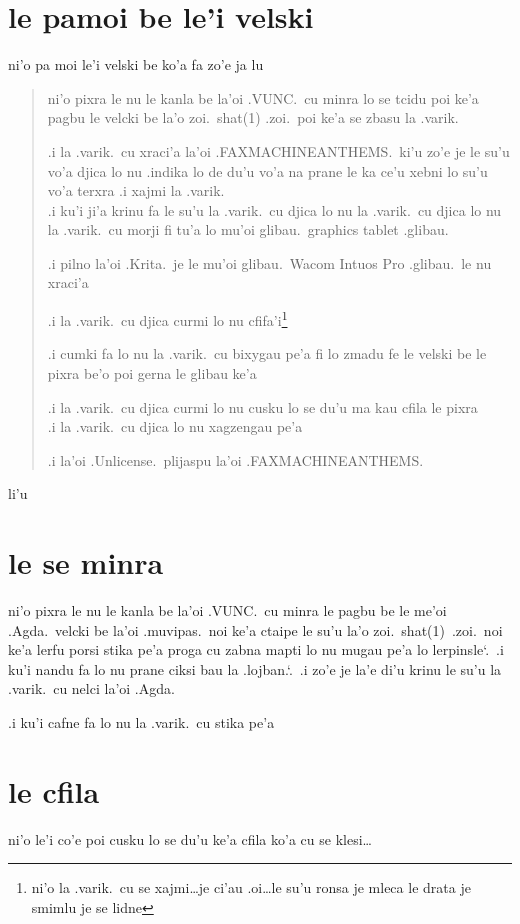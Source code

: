 \documentclass{report}
\newcommand\sds{\spacefactor\sfcode`.\ \space}
\begin{document}
\section{le pamoi be le'i velski}
ni'o pa moi le'i velski be ko'a fa zo'e ja lu

\begin{quote}
	ni'o pixra le nu le kanla be la'oi .VUNC.\ cu minra lo se tcidu poi ke'a pagbu le velcki be la'o zoi.\ shat(1) .zoi.\ poi ke'a se zbasu la .varik.

	.i la .varik.\ cu xraci'a la'oi .FAXMACHINEANTHEMS.\ ki'u zo'e je le su'u vo'a djica lo nu .indika lo de du'u vo'a na prane le ka ce'u xebni lo su'u vo'a terxra  .i xajmi la .varik.\\
.i ku'i ji'a krinu fa le su'u la .varik.\ cu djica lo nu la .varik.\ cu djica lo nu la .varik.\ cu morji fi tu'a lo mu'oi glibau.\ graphics tablet .glibau.

	.i pilno la'oi .Krita.\ je le mu'oi glibau.\ Wacom Intuos Pro .glibau.\ le nu xraci'a

	.i la .varik.\ cu djica curmi lo nu cfifa'i\footnote{ni'o la .varik.\ cu se xajmi\ldots je ci'au .oi\ldots le su'u ronsa je mleca le drata je smimlu je se lidne}

	.i cumki fa lo nu la .varik.\ cu bixygau pe'a fi lo zmadu fe le velski be le pixra be'o poi gerna le glibau ke'a

	.i la .varik.\ cu djica curmi lo nu cusku lo se du'u ma kau cfila le pixra\\
	.i la .varik.\ cu djica lo nu xagzengau pe'a

	.i la'oi .Unlicense.\ plijaspu la'oi .FAXMACHINEANTHEMS.
\end{quote}

li'u

\section{le se minra}
ni'o pixra le nu le kanla be la'oi .VUNC.\ cu minra le pagbu be le me'oi .Agda.\ velcki be la'oi .muvipas.\ noi ke'a ctaipe le su'u la'o zoi.\ shat(1)\ .zoi.\ noi ke'a lerfu porsi stika pe'a proga cu zabna mapti lo nu mugau pe'a lo lerpinsle\sds  .i ku'i nandu fa lo nu prane ciksi bau la .lojban.\sds  .i zo'e je la'e di'u krinu le su'u la .varik.\ cu nelci la'oi .Agda.

.i ku'i cafne fa lo nu la .varik.\ cu stika pe'a

\section{le cfila}
ni'o le'i co'e poi cusku lo se du'u ke'a cfila ko'a cu se klesi\ldots
\end{document}

